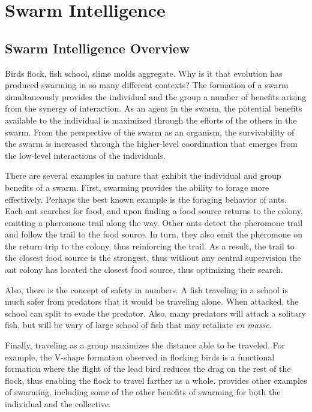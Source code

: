 \chapter{Swarm Intelligence}
\label{ch:SwarmIntelligence}

\section{Swarm Intelligence Overview}

Birds flock, fish school, slime molds aggregate.  Why is it that evolution has produced swarming in so many different contexts?  The formation of a swarm simultaneously provides the individual and the group a number of benefits arising from the synergy of interaction.  As an agent in the swarm, the potential benefits available to the individual is maximized through the efforts of the others in the swarm.  From the perspective of the swarm as an organism, the survivability of the swarm is increased through the higher-level coordination that emerges from the low-level interactions of the individuals.

There are several examples in nature that exhibit the individual and group benefits of a swarm.  First, swarming provides the ability to forage more effectively.  Perhaps the best known example is the foraging behavior of ants.  Each ant searches for food, and upon finding a food source returns to the colony, emitting a pheromone trail along the way.  Other ants detect the pheromone trail and follow the trail to the food source.  In turn, they also emit the pheromone on the return trip to the colony, thus reinforcing the trail.  As a result, the trail to the closest food source is the strongest, thus without any central supervision the ant colony has located the closest food source, thus optimizing their search.  

Also, there is the concept of safety in numbers.  A fish traveling in a school is much safer from predators that it would be traveling alone.  When attacked, the school can split to evade the predator.  Also, many predators will attack a solitary fish, but will be wary of large school of fish that may retaliate \emph{en masse}.  

Finally, traveling as a group maximizes the distance able to be traveled.  For example, the V-shape formation observed in flocking birds is a functional formation where the flight of the lead bird reduces the drag on the rest of the flock, thus enabling the flock to travel farther as a whole.   provides other examples of swarming, including some of the other benefits of swarming for both the individual and the collective.


